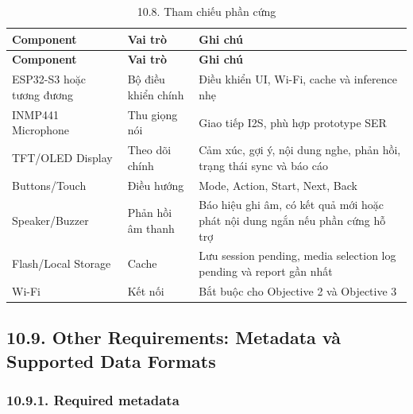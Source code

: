 \documentclass[12pt,a4paper]{article}
\begin{document}
\begin{center}
\begin{longtable}{|P{0.25\textwidth}|P{0.32\textwidth}|P{0.33\textwidth}|}
\caption{10.8. Tham chiếu phần cứng}\\
\hline
\textbf{Component} & \textbf{Vai trò} & \textbf{Ghi chú} \\
\hline
\endfirsthead
\hline
\textbf{Component} & \textbf{Vai trò} & \textbf{Ghi chú} \\
\hline
\endhead
ESP32-S3 hoặc tương đương & Bộ điều khiển chính & Điều khiển UI, Wi-Fi, cache và inference nhẹ \\
\hline
INMP441 Microphone & Thu giọng nói & Giao tiếp I2S, phù hợp prototype SER \\
\hline
TFT/OLED Display & Theo dõi chính & Cảm xúc, gợi ý, nội dung nghe, phản hồi, trạng thái sync và báo cáo \\
\hline
Buttons/Touch & Điều hướng & Mode, Action, Start, Next, Back \\
\hline
Speaker/Buzzer & Phản hồi âm thanh & Báo hiệu ghi âm, có kết quả mới hoặc phát nội dung ngắn nếu phần cứng hỗ trợ \\
\hline
Flash/Local Storage & Cache & Lưu session pending, media selection log pending và report gần nhất \\
\hline
Wi-Fi & Kết nối & Bắt buộc cho Objective 2 và Objective 3 \\
\hline
\end{longtable}
\end{center}

\subsection*{10.9. Other Requirements: Metadata và Supported Data Formats}

\subsubsection*{10.9.1. Required metadata}
\end{document}
